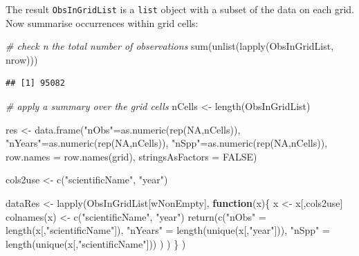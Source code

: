 \documentclass[
  10pt,
]{article}
\newenvironment{Shaded}{\begin{snugshade}}{\end{snugshade}}
\newcommand{\AttributeTok}[1]{\textcolor[rgb]{0.77,0.63,0.00}{#1}}
\newcommand{\CommentTok}[1]{\textcolor[rgb]{0.56,0.35,0.01}{\textit{#1}}}
\newcommand{\ConstantTok}[1]{\textcolor[rgb]{0.00,0.00,0.00}{#1}}
\newcommand{\ControlFlowTok}[1]{\textcolor[rgb]{0.13,0.29,0.53}{\textbf{#1}}}
\newcommand{\FunctionTok}[1]{\textcolor[rgb]{0.00,0.00,0.00}{#1}}
\newcommand{\NormalTok}[1]{#1}
\newcommand{\OtherTok}[1]{\textcolor[rgb]{0.56,0.35,0.01}{#1}}
\newcommand{\StringTok}[1]{\textcolor[rgb]{0.31,0.60,0.02}{#1}}
\begin{document}
The result \texttt{ObsInGridList} is a \texttt{list} object with a subset of the data on each grid. Now summarise occurrences within grid cells:

\begin{Shaded}
\begin{Highlighting}[]
\CommentTok{\# check n the total number of observations}
\FunctionTok{sum}\NormalTok{(}\FunctionTok{unlist}\NormalTok{(}\FunctionTok{lapply}\NormalTok{(ObsInGridList, nrow)))}
\end{Highlighting}
\end{Shaded}

\begin{verbatim}
## [1] 95082
\end{verbatim}

\begin{Shaded}
\begin{Highlighting}[]
\CommentTok{\# apply a summary over the grid cells }
\NormalTok{nCells }\OtherTok{\textless{}{-}} \FunctionTok{length}\NormalTok{(ObsInGridList)}

\NormalTok{res }\OtherTok{\textless{}{-}} \FunctionTok{data.frame}\NormalTok{(}\StringTok{"nObs"}\OtherTok{=}\FunctionTok{as.numeric}\NormalTok{(}\FunctionTok{rep}\NormalTok{(}\ConstantTok{NA}\NormalTok{,nCells)),}
                  \StringTok{"nYears"}\OtherTok{=}\FunctionTok{as.numeric}\NormalTok{(}\FunctionTok{rep}\NormalTok{(}\ConstantTok{NA}\NormalTok{,nCells)),}
                  \StringTok{"nSpp"}\OtherTok{=}\FunctionTok{as.numeric}\NormalTok{(}\FunctionTok{rep}\NormalTok{(}\ConstantTok{NA}\NormalTok{,nCells)),}
                  \AttributeTok{row.names =} \FunctionTok{row.names}\NormalTok{(grid),}
                  \AttributeTok{stringsAsFactors =} \ConstantTok{FALSE}\NormalTok{)}

\NormalTok{cols2use }\OtherTok{\textless{}{-}} \FunctionTok{c}\NormalTok{(}\StringTok{"scientificName"}\NormalTok{, }\StringTok{"year"}\NormalTok{)}

\NormalTok{dataRes }\OtherTok{\textless{}{-}} \FunctionTok{lapply}\NormalTok{(ObsInGridList[wNonEmpty], }
                  \ControlFlowTok{function}\NormalTok{(x)\{}
\NormalTok{                    x }\OtherTok{\textless{}{-}}\NormalTok{ x[,cols2use]}
                    \FunctionTok{colnames}\NormalTok{(x) }\OtherTok{\textless{}{-}} \FunctionTok{c}\NormalTok{(}\StringTok{"scientificName"}\NormalTok{, }\StringTok{"year"}\NormalTok{)}
                    \FunctionTok{return}\NormalTok{(}\FunctionTok{c}\NormalTok{(}\StringTok{"nObs"} \OtherTok{=} \FunctionTok{length}\NormalTok{(x[,}\StringTok{"scientificName"}\NormalTok{]),}
                             \StringTok{"nYears"} \OtherTok{=} \FunctionTok{length}\NormalTok{(}\FunctionTok{unique}\NormalTok{(x[,}\StringTok{"year"}\NormalTok{])),}
                             \StringTok{"nSpp"} \OtherTok{=} \FunctionTok{length}\NormalTok{(}\FunctionTok{unique}\NormalTok{(x[,}\StringTok{"scientificName"}\NormalTok{]))}
\NormalTok{                             )}
\NormalTok{                           )}
\NormalTok{                    \}}
\NormalTok{                  )}


\end{Highlighting}
\end{Shaded}
\end{document}

